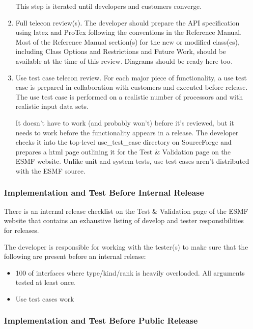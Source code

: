 \begin{enumerate}
This step is iterated until developers and customers converge.

\item Full telecon review(s). The developer should prepare the API specification
using latex and ProTex following the conventions in the Reference Manual.
Most of the Reference Manual section(s) for the new or modified class(es),
including Class Options and Restrictions and Future Work, should be available
at the time of this review. Diagrams should be ready here too.

\item Use test case telecon review. For each major piece of functionality, a use
test case is prepared in collaboration with customers and executed before
release. The use test case is performed on a realistic number of processors
and with realistic input data sets.

It doesn't have to work (and probably won't) before it's reviewed, but it
needs to work before the functionality appears in a release. The developer
checks it into the top-level use\_test\_case directory on SourceForge and
prepares a html page outlining it for the Test \& Validation page on the
ESMF website. Unlike unit and system tests, use test cases aren't
distributed with the ESMF source.
\end{enumerate}

\subsubsection{Implementation and Test Before Internal Release}

There is an internal release checklist on the Test \& Validation page of the
ESMF website that contains an exhaustive listing of develop and tester
responsibilities for releases.

The developer is responsible for working with the tester(s) to make sure
that the following are present before an internal release:
\begin{itemize}
\item 100%
of interfaces where type/kind/rank is heavily overloaded. All arguments tested
at least once.
\item Use test cases work
\end{itemize}

\subsubsection{Implementation and Test Before Public Release}

